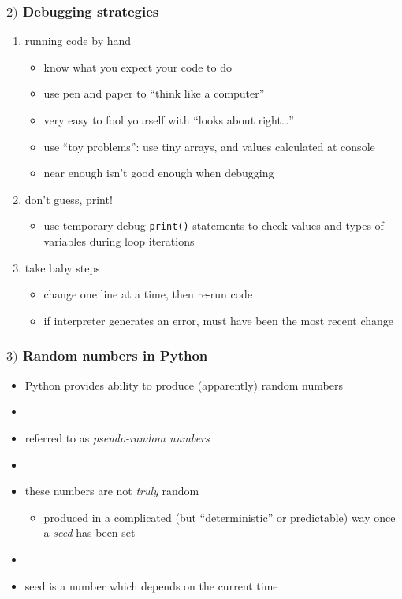 \documentclass[english,14pt]{beamer}
\newcommand\red[1]{{\color{red} #1}}
\begin{document}
\begin{frame}[fragile]

\frametitle{$2)$ Debugging strategies}

\begin{enumerate}
	\item running code by hand
	\begin{itemize}
		\item know what you expect your code to do
		\item use pen and paper to ``think like a computer''
		\item very easy to fool yourself with ``looks about right\ldots''
		\item use ``toy problems'': use tiny arrays, and values calculated at console
		\item near enough isn't good enough when debugging
	\end{itemize}
	
	\item don't guess, print!
	\begin{itemize}
		\item use temporary debug \texttt{print()} statements to check values and types of
		variables during loop iterations
	\end{itemize}
	\item take baby steps
		\begin{itemize}
			\item change one line at a time, then re-run code
			\item if interpreter generates an error, must have been the most recent change
		\end{itemize}
\end{enumerate}

\end{frame}


\begin{frame}[fragile]

\frametitle{$3)$ Random numbers in Python}

\begin{itemize}
	\item Python provides ability to produce (apparently) random numbers
	\item[]
	\item referred to as \red{\emph{pseudo-random numbers}}
	\item[]
	\item these numbers are not \emph{truly} random
	\begin{itemize}
		\item produced in a complicated (but ``deterministic'' or predictable) way once a \red{\emph{seed}} has been set
	\end{itemize}	
	\item[]
	\item seed is a number which depends on the current time
		
\end{itemize}

\end{frame}
\end{document}
